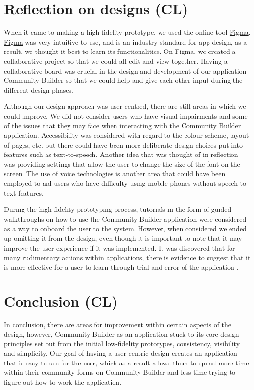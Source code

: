 \documentclass[a4paper,12pt]{article}
\begin{document}
\section{Reflection on designs (CL)}
When it came to making a high-fidelity prototype, we used the online tool \href{https://www.figma.com/}{Figma}. \href{https://www.figma.com/}{Figma} was very intuitive to use, and is an industry standard for app design, as a result, we thought it best to learn its functionalities. On Figma, we created a collaborative project so that we could all edit and view together. Having a collaborative board was crucial in the design and development of our application Community Builder so that we could help and give each other input during the different design phases. 

Although our design approach was user-centred, there are still areas in which we could improve. We did not consider users who have visual impairments and some of the issues that they may face when interacting with the Community Builder application. Accessibility was considered with regard to the colour scheme, layout of pages, etc. but there could have been more deliberate design choices put into features such as text-to-speech. Another idea that was thought of in reflection was providing settings that allow the user to change the size of the font on the screen. The use of voice technologies is another area that could have been employed to aid users who have difficulty using mobile phones without speech-to-text features. 

During the high-fidelity prototyping process, tutorials in the form of guided walkthroughs on how to use the Community Builder application were considered as a way to onboard the user to the system. However, when considered we ended up omitting it from the design, even though it is important to note that it may improve the user experience if it was implemented. It was discovered that for many rudimentary actions within applications, there is evidence to suggest that it is more effective for a user to learn through trial and error of the application \citep{Andersen_2012}.
\section{Conclusion (CL)}
In conclusion, there are areas for improvement within certain aspects of the design, however, Community Builder as an application stuck to its core design principles set out from the initial low-fidelity prototypes, consistency, visibility and simplicity. Our goal of having a user-centric design creates an application that is easy to use for the user, which as a result allows them to spend more time within their community forms on Community Builder and less time trying to figure out how to work the application. 

\newpage


\end{document}
